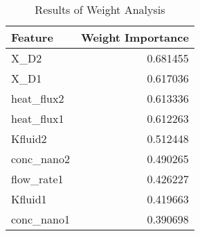 
    \begin{table*}
        \centering
        \begin{tabular}{lr}
\hline
 Feature     &   Weight Importance \\
\hline
 X\_D2       &            0.681455 \\
 X\_D1       &            0.617036 \\
 heat\_flux2 &            0.613336 \\
 heat\_flux1 &            0.612263 \\
 Kfluid2     &            0.512448 \\
 conc\_nano2 &            0.490265 \\
 flow\_rate1 &            0.426227 \\
 Kfluid1     &            0.419663 \\
 conc\_nano1 &            0.390698 \\
\hline
\end{tabular}
        \caption{Results of Weight Analysis}
        \label{weight_analysis}
    \end{table*}
    
